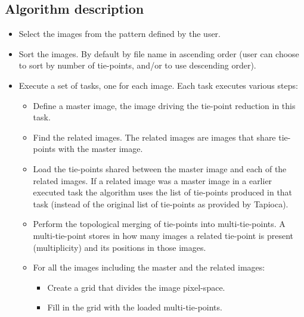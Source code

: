 \subsection{Algorithm description}

\begin{itemize}
\item Select the images from the pattern defined by the user. 

\item Sort the images. By default by file name in ascending order (user can choose to sort by number of tie-points, and/or to use descending order). 

\item Execute a set of tasks, one for each image. Each task executes various steps:
   \begin{itemize}
   
   \item Define a master image, the image driving the tie-point reduction in this task.
   
   \item Find the related images. The related images are images that share tie-points with the master image. 
   
   \item Load the tie-points shared between the master image and each of the related images. If a related image was a master image in a earlier executed task the algorithm uses the list of tie-points produced in that task (instead of the original list of tie-points as provided by Tapioca).

   \item Perform the topological merging of tie-points into multi-tie-points. A multi-tie-point stores in how many images a related tie-point is present (multiplicity) and its positions in those images. 
   
   \item For all the images including the master and the related images: 
      \begin{itemize}
      \item Create a grid that divides the image pixel-space. 
      
      \item Fill in the grid with the loaded multi-tie-points.
      \end{itemize}      
      

\end{itemize}
\end{itemize}
